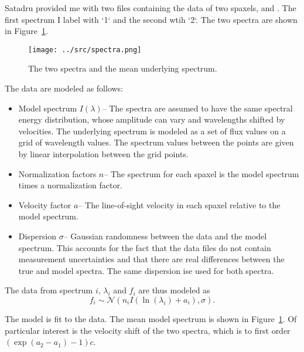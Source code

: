 \documentclass[11pt, oneside]{article}   	%
\begin{document}

Satadru provided me with two files containing the data of two spaxels,
 and .
The first spectrum I  label with `1` and the second wtih `2`.
The two spectra are shown in Figure~\ref{spectra:example}.

\begin{figure}[htbp] %
   \centering
   \texttt{[image: ../src/spectra.png]} 
   \caption{The two spectra and the mean underlying spectrum.
   \label{spectra:example}}
\end{figure}

The data are modeled as follows:
\begin{itemize}
\item Model spectrum $I(\lambda)$-- The spectra are assumed to have the same spectral energy distribution, whose amplitude can vary and wavelengths shifted by velocities.
The underlying spectrum is modeled as a set of flux values on a grid of wavelength values.  The spectrum values between the points are given by linear interpolation between
the grid points.
\item Normalization factors $n$-- The spectrum for each spaxel is the model spectrum times a normalization factor.
\item Velocity factor $a$-- The line-of-sight velocity in each spaxel relative to the model spectrum.  
\item Dispersion $\sigma$-- Gaussian randomness between the data and the model spectrum.  This accounts for the fact
that the data files do not contain measurement uncertainties and that there are real differences between the true and model spectra.  The same dispersion
ise used for both spectra.
\end{itemize}

The data from spectrum $i$, $\lambda_i$ and $f_i$ are thus modeled as
\begin{equation}
f_i \sim \mathcal{N}\left(n_i I(\ln(\lambda_i) + a_i), \sigma\right).
\end{equation}

The model is fit to the data.
The mean model spectrum is shown in Figure~\ref{spectra:example}.
Of particular interest is the velocity shift of the two spectra, which is to first order
$(\exp{\left(a_2-a_1\right) }- 1)c$. 
\end{document}
